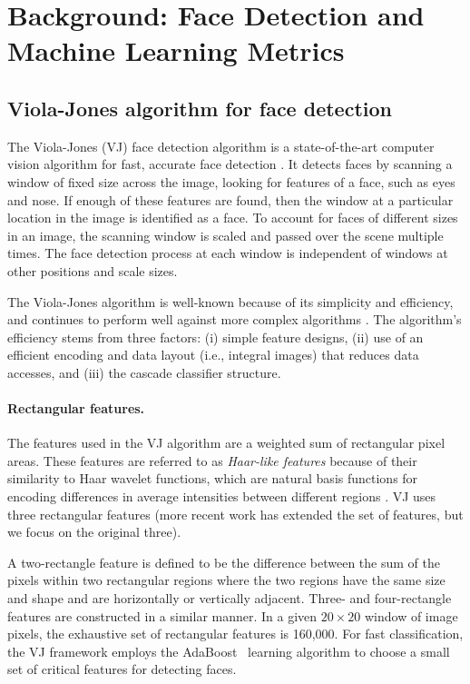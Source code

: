 \section{Background: Face Detection and Machine Learning Metrics}
\label{sec:backvj}

\subsection{Viola-Jones algorithm for face detection}

The Viola-Jones (VJ) face detection algorithm is a state-of-the-art computer vision algorithm for fast, accurate face detection \cite{vj_journal}. It detects faces by scanning a window of fixed size across the image, looking for features of a face, such as eyes and nose. If enough of these features are found, then the window at a particular location in the image is identified as a face. To account for faces of different sizes in an image, the scanning window is scaled and passed over the scene multiple times. The face detection process at each window is independent of windows at other positions and scale sizes.

The Viola-Jones algorithm is well-known because of its simplicity and efficiency,
and continues to perform well against more complex algorithms \cite{mathias_fd}.
The algorithm's efficiency stems from three factors: (i) simple feature
designs, (ii) use of an efficient encoding and data layout (i.e., integral images) that reduces data accesses, and (iii) the cascade classifier structure.

\paragraph{Rectangular features.} The features used in the VJ algorithm
are a weighted sum of rectangular pixel areas. These features are referred to
as \textit{Haar-like features} because of their similarity to Haar wavelet
functions, which are natural basis functions for encoding differences in average intensities
between different regions \cite{haar_basis}.
VJ uses three rectangular features (more
recent work has extended the set of features, but we focus on the original three).

A two-rectangle feature is defined to be the difference between the sum of the
pixels within two rectangular regions where the two regions have the same size
and shape and are horizontally or vertically adjacent. Three- and four-rectangle
features are constructed in a similar manner. In a given $20\times 20$ window of image
pixels, the exhaustive set of rectangular features is 160,000. For fast
classification, the VJ framework employs the AdaBoost~\cite{adaboost} learning algorithm to choose a
small set of critical features for detecting faces.

